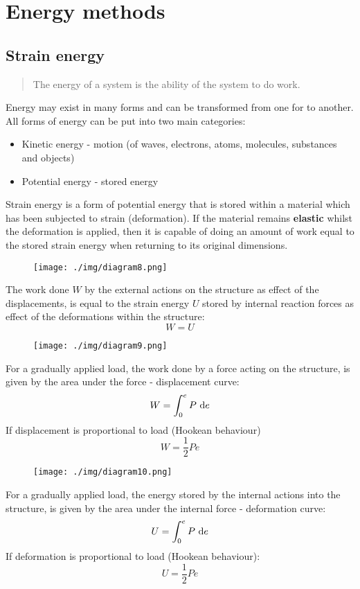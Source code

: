 \chapter{Energy methods}
\section{Strain energy}
\begin{quotation}
  The energy of a system is the ability of the system to do work.
\end{quotation}
Energy may exist in many forms and can be transformed from one for to another. All forms of energy can be put into two main categories:
\begin{itemize}
  \item Kinetic energy - motion (of waves, electrons, atoms, molecules, substances and objects)
  \item Potential energy - stored energy
\end{itemize}
Strain energy is a form of potential energy that is stored within a material which has been subjected to strain (deformation). If the material remains \textbf{elastic} whilst the deformation is applied, then it is capable of doing an amount of work equal to the stored strain energy when returning to its original dimensions.
\begin{figure}[H]
  \centering
  \texttt{[image: ./img/diagram8.png]}
  \caption{}
\end{figure}
The work done $W$ by the external actions on the structure as effect of the displacements, is equal to the strain energy $U$ stored by internal reaction forces as effect of the deformations within the structure:
\begin{equation}
  W = U
\end{equation}
\begin{figure}[H]
  \centering
  \texttt{[image: ./img/diagram9.png]}
  \caption{}
\end{figure}
For a gradually applied load, the work done by a force acting on the structure, is given by the area under the force - displacement curve:
\begin{equation}
  W = \int_0^e P \, \dif e
\end{equation}
If displacement is proportional to load (Hookean behaviour)
\begin{equation}
  W = \frac{1}{2} Pe
\end{equation}
\begin{figure}[H]
  \centering
  \texttt{[image: ./img/diagram10.png]}
  \caption{}
\end{figure}
For a gradually applied load, the energy stored by the internal actions into the structure, is given by the area under the internal force - deformation curve:
\begin{equation}
  U = \int_0^e P \, \dif e
\end{equation}
If deformation is proportional to load (Hookean behaviour):
\begin{equation}
  U = \frac{1}{2} P e
\end{equation}
